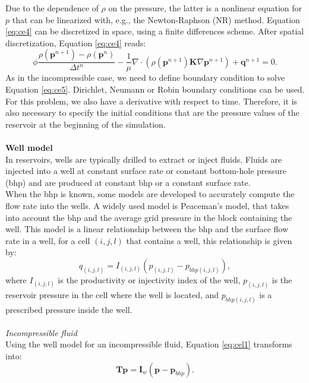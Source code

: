 \documentclass[12pt]{article}
\begin{document}
Due to the dependence of $\rho$ on the pressure, the latter is a nonlinear equation for $p$ that can be linearized with, e.g., the Newton-Raphson (NR) method.
Equation \eqref{eq:ce4} can be discretized in space, using a finite differences scheme. After spatial discretization, Equation \eqref{eq:ce4} reads:
\begin{equation}\label{eq:ce5}
 {\phi}\frac{{\rho}(\mathbf{p}^{n+1})
 -{\rho}(\mathbf{p}^{n})}{\Delta t^n}
 -\frac{1}{\mu}\nabla \cdot ({\rho}(\mathbf{p}^{n+1}) 
 \mathbf{K}\nabla\mathbf{p}^{n+1})+\mathbf{q}^{n+1}=0.
\end{equation}
As in the incompressible case, we need to define boundary condition to solve Equation \eqref{eq:ce5}. Dirichlet, Neumann or Robin boundary conditions can be used. For this problem, we also have a derivative with respect to time. Therefore, it is also necessary to specify the initial conditions that are the pressure values of the reservoir at the beginning of the simulation.\\\\
\textbf{Well model}\\
In reservoirs, wells are typically drilled to extract or inject fluids. Fluids are injected into a well at constant 
surface rate or constant bottom-hole pressure (bhp) and are produced at constant bhp or a constant surface rate.\\
 When the bhp is known, some models are developed to accurately compute the flow rate into the wells. 
 A widely used model is Peaceman's model, that takes into account the bhp and the average grid pressure in the block containing the well. 
This model is a linear relationship between the bhp and the surface flow rate in a well, for a cell $(i,j,l)$ that contains a well, this relationship is given by:
\begin{equation}\label{eq:wellm}
{q}_{(i,j,l)}={I}_{(i,j,l)}({p}_{(i,j,l)}-{p}_{bhp(i,j,l)}),
\end{equation}
where ${I}_{(i,j,l)}$ is the productivity or injectivity index of the well, ${p}_{(i,j,l)}$ is the reservoir pressure in the cell 
where the well is located, 
and ${p}_{bhp(i,j,l)}$ is a prescribed pressure inside the well. \\\\
\emph{Incompressible fluid}\\
Using the well model for an incompressible fluid, Equation \eqref{eq:cel1} transforms into:
 \begin{equation}\label{eq:celw1}
\mathbf{T}\mathbf{p} = \mathbf{I}_w(\mathbf{p}-\mathbf{p}_{bhp}).
\end{equation}
\end{document}
